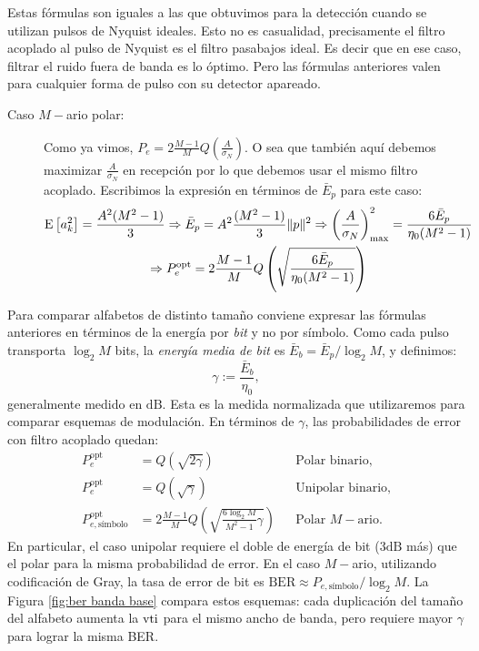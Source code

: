 Estas fórmulas son iguales a las que obtuvimos para la detección cuando se utilizan pulsos de Nyquist ideales. Esto no es casualidad, precisamente el filtro acoplado al pulso de Nyquist es el filtro pasabajos ideal. Es decir que en ese caso, filtrar el ruido fuera de banda es lo óptimo. Pero las fórmulas anteriores valen para cualquier forma de pulso con su detector apareado.

\begin{description}
\item[Caso $M-$ario polar:] Como ya vimos, $P_e=2\frac{M-1}{M} Q\left(\frac{A}{\sigma_N}\right)$. O sea que también aquí debemos maximizar $\frac{A}{\sigma_N}$ en recepción por lo que debemos usar el mismo filtro acoplado. Escribimos la expresión en términos de $\bar{E}_p$ para este caso:
\begin{gather*}
 \mathrm{E}\left[a_k^2\right] = \frac{A^2 (M^2-1)}{3} \Rightarrow \bar{E}_p = A^2 \frac{(M^2-1)}{3}\|p\|^2 \Rightarrow \left(\frac{A}{\sigma_N}\right)^2_{\max} = \frac{6 \bar{E}_p}{\eta_0 (M^2-1)}\\
\Rightarrow {P_e^{\mathrm{opt}} = 2\frac{M-1}{M}
Q\left(\sqrt{\frac{6\bar{E}_p}{\eta_0(M^2-1)}}\right)}
\end{gather*}
\end{description}

Para comparar alfabetos de distinto tamaño conviene expresar las fórmulas anteriores en términos de la energía por \emph{bit} y no por símbolo. Como cada pulso transporta $\log_2 M$ bits, la \emph{energía media de bit} es $\bar{E}_b = \bar{E}_p/\log_2 M$, y definimos:
\begin{equation}\label{eq:def gamma}
    \gamma := \frac{\bar{E}_b}{\eta_0},
\end{equation}
generalmente medido en $\unit{\deci\bel}$. Esta es la medida normalizada que utilizaremos para comparar esquemas de modulación. En términos de $\gamma$, las probabilidades de error con filtro acoplado quedan:
\begin{align*}
    P_e^{\mathrm{opt}} &= Q\left(\sqrt{2\gamma}\right) & &\text{Polar binario},\\
    P_e^{\mathrm{opt}} &= Q\left(\sqrt{\gamma}\right) & &\text{Unipolar binario},\\
    P_{e,\text{símbolo}}^{\mathrm{opt}} &= 2\frac{M-1}{M}Q\left(\sqrt{\frac{6\log_2 M}{M^2-1}\gamma}\right) & &\text{Polar $M-$ario}.
\end{align*}
En particular, el caso unipolar requiere el doble de energía de bit ($3\unit{\deci\bel}$ más) que el polar para la misma probabilidad de error. En el caso $M-$ario, utilizando codificación de Gray, la tasa de error de bit es $\mathrm{BER}\approx P_{e,\text{símbolo}}/\log_2 M$. La Figura \ref{fig:ber banda base} compara estos esquemas: cada duplicación del tamaño del alfabeto aumenta la $\mathrm{vti}$ para el mismo ancho de banda, pero requiere mayor $\gamma$ para lograr la misma BER.

